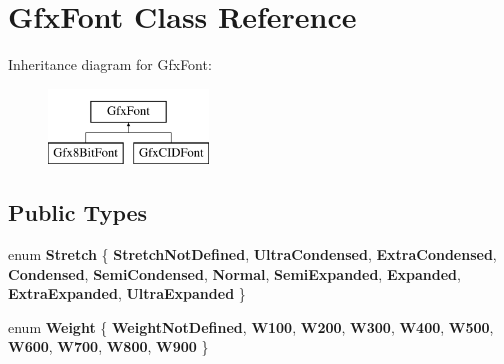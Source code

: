 \hypertarget{class_gfx_font}{}\section{Gfx\+Font Class Reference}
\label{class_gfx_font}
Inheritance diagram for Gfx\+Font\+:\begin{figure}[H]
\begin{center}
\leavevmode
\includegraphics[height=2.000000cm]{class_gfx_font}
\end{center}
\end{figure}
\subsection*{Public Types}
\begin{DoxyCompactItemize}
\item 
\mbox{\label{class_gfx_font_ae7a18a1242b9cdf52a6f106caac6320d}} 
enum {\bfseries Stretch} \{ \newline
{\bfseries Stretch\+Not\+Defined}, 
{\bfseries Ultra\+Condensed}, 
{\bfseries Extra\+Condensed}, 
{\bfseries Condensed}, 
\newline
{\bfseries Semi\+Condensed}, 
{\bfseries Normal}, 
{\bfseries Semi\+Expanded}, 
{\bfseries Expanded}, 
\newline
{\bfseries Extra\+Expanded}, 
{\bfseries Ultra\+Expanded}
 \}
\item 
\mbox{\label{class_gfx_font_addc7780515cc6fd94183fccfc423a6e0}} 
enum {\bfseries Weight} \{ \newline
{\bfseries Weight\+Not\+Defined}, 
{\bfseries W100}, 
{\bfseries W200}, 
{\bfseries W300}, 
\newline
{\bfseries W400}, 
{\bfseries W500}, 
{\bfseries W600}, 
{\bfseries W700}, 
\newline
{\bfseries W800}, 
{\bfseries W900}
 \}
\end{DoxyCompactItemize}
